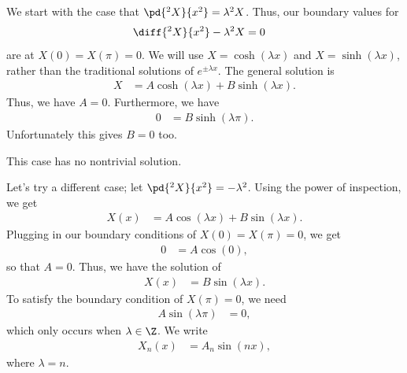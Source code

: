 \documentclass[10pt]{mypackage}
\begin{document}
\begin{example}
  We start with the case that $ \pd{^2X}{x^2} = \lambda^2 X $. Thus, our boundary values for 
  \begin{align*}
    \diff{^2X}{x^2} - \lambda^2 X &= 0
  \end{align*}
  are at $X(0) = X(\pi) = 0$. We will use $X = \cosh\left( \lambda x \right)$ and $X = \sinh\left( \lambda x \right)$, rather than the traditional solutions of $e^{\pm \lambda x}$. The general solution is
  \begin{align*}
    X &= A\cosh\left( \lambda x \right) + B\sinh\left( \lambda x \right).
  \end{align*}
  Thus, we have $A = 0$. Furthermore, we have
  \begin{align*}
    0 &= B\sinh\left( \lambda \pi \right).
  \end{align*}
  Unfortunately this gives $B = 0$ too.\newline

  This case has no nontrivial solution.\newline

  Let's try a different case; let $ \pd{^2 X}{x^2} = -\lambda^2 $. Using the power of inspection, we get
  \begin{align*}
    X(x) &= A\cos\left( \lambda x \right) + B\sin\left( \lambda x \right).
  \end{align*}
  Plugging in our boundary conditions of $X(0) = X(\pi) = 0$, we get
  \begin{align*}
    0 &= A\cos\left( 0 \right),
  \end{align*}
  so that $A = 0$. Thus, we have the solution of
  \begin{align*}
    X(x) &= B\sin\left( \lambda x \right).
  \end{align*}
  To satisfy the boundary condition of $X(\pi) = 0$, we need
  \begin{align*}
    A \sin\left( \lambda \pi \right) &= 0,
  \end{align*}
  which only occurs when $\lambda\in \Z$. We write
  \begin{align*}
    X_n(x) &= A_{n}\sin\left( n x \right),
  \end{align*}
  where $\lambda = n$.\newline


\end{example}
\end{document}
